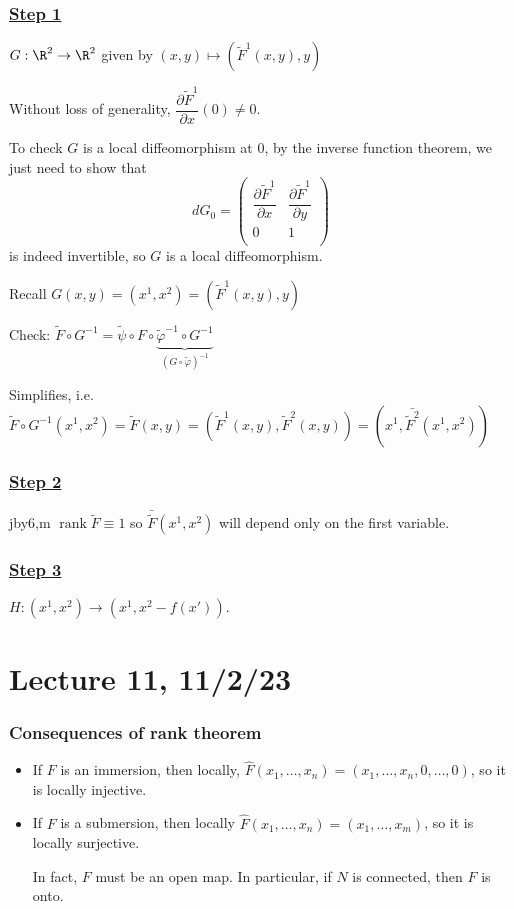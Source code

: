 \documentclass[x11names,reqno,14pt]{extarticle}
\DeclareMathOperator{\rank}{rank}
\newcommand{\pp}[2]{\dfrac{\partial #1}{\partial #2}}
\renewcommand{\phi}{\varphi}
\begin{document}
\subsubsection*{\underline{Step 1}}

$G:\R^2\to\R^2$ given by $(x, y) \mapsto (\tilde{F}^1(x, y), y)$

Without loss of generality, $\pp{\tilde{F}^1}{x}(0)\neq0$. 

To check $G$ is a local diffeomorphism at 0, by the inverse function theorem, we just need to show that 
\[
dG_0 = \begin{pmatrix} \pp{\tilde{F}^1}{x} & \pp{\tilde{F}^1}{y} \\ 0 & 1 \\ \end{pmatrix}
\]
is indeed invertible, so $G$ is a local diffeomorphism.

Recall $G(x, y) = (x^1,x^2) = (\tilde{F}^1(x, y), y)$

Check: $\tilde{F}\circ G^{-1} = \tilde{\psi}\circ F\circ\underbrace{\tilde{\phi}^{-1} \circ G^{-1}}_{(G\circ\tilde{\phi})^{-1}}$

Simplifies, i.e. $\tilde{F}\circ G^{-1}(x^1,x^2) = \tilde{F}(x, y) = (\tilde{F}^1(x, y), \tilde{F}^2(x, y)) = (x^1, \bar{\tilde{F}^2}(x^1, x^2))$

\subsubsection*{\underline{Step 2}}
jby6,m
$\rank\tilde{F} \equiv 1$ so $\bar{\tilde{F}}(x^1, x^2)$ will depend only on the first variable. 

\subsubsection*{\underline{Step 3}}

$H:(x^1,x^2)\to(x^1,x^2 - f(x'))$. 

\section*{Lecture 11, 11/2/23}

\subsubsection*{Consequences of rank theorem}
\begin{itemize}

\item If $F$ is an immersion, then locally, $\hat{F}(x_1, \dots, x_n) = (x_1, \dots, x_n, 0, \dots, 0)$, so it is locally injective.

\item If $F$ is a submersion, then locally $\hat{F}(x_1, \dots, x_n) = (x_1, \dots, x_m)$, so it is locally surjective. 

In fact, $F$ must be an open map. In particular, if $N$ is connected, then $F$ is onto. 

\end{itemize}
\end{document}
